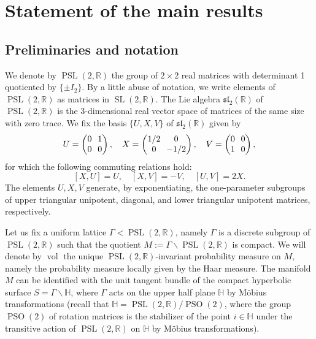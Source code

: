 \documentclass[11pt]{article}
\newcommand \R{\mathbb{R}}
\newcommand \Hbb{\mathbb{H}}
\DeclareMathOperator{\SL}{SL}
\DeclareMathOperator{\PSL}{PSL}
\DeclareMathOperator{\PSO}{PSO}
\DeclareMathOperator{\vol}{vol}
\theoremstyle{definition}
\begin{document}
\section{Statement of the main results}\label{sec:statement}

\subsection{Preliminaries and notation}

We denote by $\PSL(2,\R)$ the group of $2 \times 2$ real matrices with determinant 1 quotiented by $\{\pm I_2\}$.
By a little abuse of notation, we write elements of $\PSL(2,\R)$ as matrices in $\SL(2,\R)$.
The Lie algebra $\mathfrak{sl}_2(\R)$ of $\PSL(2,\R)$ is the 3-dimensional real vector space of matrices of the same size with zero trace.
We fix the basis $\{ U,X,V \}$ of $\mathfrak{sl}_2(\R)$ given by\vspace*{-3pt}
\[\arraycolsep3.5pt
U =
\begin{pmatrix}
0 & 1 \\
0 & 0
\end{pmatrix},
\ \ \
X =
\begin{pmatrix}
1/2 & 0 \\
0 & -1/2
\end{pmatrix},
\ \ \
V =
\begin{pmatrix}
0 & 0 \\
1 & 0
\end{pmatrix},
\]
for which the following commuting relations hold:\vspace*{-3pt}
\[
[X,U] = U, \quad [X,V] = -V, \quad [U,V]= 2X.
\]
The elements $U, X, V$ generate, by exponentiating, the one-parameter subgroups of upper triangular unipotent, diagonal, and lower triangular unipotent matrices, respectively.

Let us fix a uniform lattice $\Gamma < \PSL(2,\R)$, namely $\Gamma$ is a discrete subgroup of $\PSL(2,\R)$ such that the quotient $M := \Gamma \backslash \PSL(2,\R)$ is compact.
We will denote by $\vol$ the unique $\PSL(2,\R)$-invariant probability measure on $M$, namely the probability measure locally given by the Haar measure.
The manifold $M$ can be identified with the unit tangent bundle of the compact hyperbolic surface $S = \Gamma \backslash \Hbb$, where $\Gamma$ acts on the upper half plane $\Hbb$ by Möbius transformations (recall that $\Hbb = \PSL(2,\R) / \PSO(2)$, where the group $\PSO(2)$ of rotation matrices is the stabilizer of the point $i \in \Hbb$ under the transitive action of $\PSL(2,\R)$ on $\Hbb$ by Möbius transformations).
\end{document}

